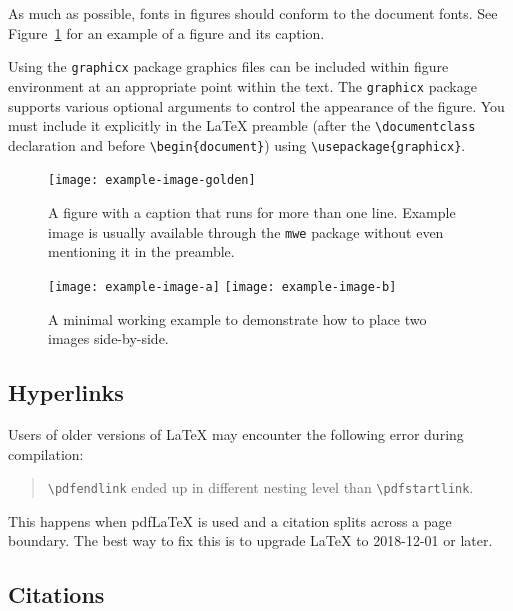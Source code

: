 \documentclass[11pt]{article}
\begin{document}
As much as possible, fonts in figures should conform
to the document fonts. See Figure~\ref{fig:experiments} for an example of a figure and its caption.

Using the \verb|graphicx| package graphics files can be included within figure
environment at an appropriate point within the text.
The \verb|graphicx| package supports various optional arguments to control the
appearance of the figure.
You must include it explicitly in the \LaTeX{} preamble (after the
\verb|\documentclass| declaration and before \verb|\begin{document}|) using
\verb|\usepackage{graphicx}|.

\begin{figure}[t]
  \texttt{[image: example-image-golden]}
  \caption{A figure with a caption that runs for more than one line.
    Example image is usually available through the \texttt{mwe} package
    without even mentioning it in the preamble.}
  \label{fig:experiments}
\end{figure}

\begin{figure}[t]
  \texttt{[image: example-image-a]} \hfill
  \texttt{[image: example-image-b]}
  \caption {A minimal working example to demonstrate how to place
    two images side-by-side.}
\end{figure}

\subsection{Hyperlinks}

Users of older versions of \LaTeX{} may encounter the following error during compilation:
\begin{quote}
\verb|\pdfendlink| ended up in different nesting level than \verb|\pdfstartlink|.
\end{quote}
This happens when pdf\LaTeX{} is used and a citation splits across a page boundary. The best way to fix this is to upgrade \LaTeX{} to 2018-12-01 or later.

\subsection{Citations}
\end{document}
